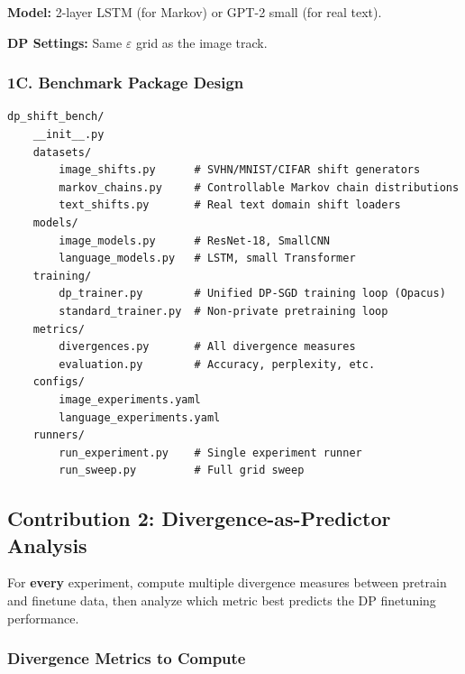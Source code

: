 \documentclass[11pt,a4paper]{article}
\begin{document}
\textbf{Model:} 2-layer LSTM (for Markov) or GPT-2 small (for real text).

\textbf{DP Settings:} Same $\varepsilon$ grid as the image track.

\subsubsection{1C. Benchmark Package Design}

\begin{lstlisting}
dp_shift_bench/
    __init__.py
    datasets/
        image_shifts.py      # SVHN/MNIST/CIFAR shift generators
        markov_chains.py     # Controllable Markov chain distributions
        text_shifts.py       # Real text domain shift loaders
    models/
        image_models.py      # ResNet-18, SmallCNN
        language_models.py   # LSTM, small Transformer
    training/
        dp_trainer.py        # Unified DP-SGD training loop (Opacus)
        standard_trainer.py  # Non-private pretraining loop
    metrics/
        divergences.py       # All divergence measures
        evaluation.py        # Accuracy, perplexity, etc.
    configs/
        image_experiments.yaml
        language_experiments.yaml
    runners/
        run_experiment.py    # Single experiment runner
        run_sweep.py         # Full grid sweep
\end{lstlisting}

\subsection{Contribution 2: Divergence-as-Predictor Analysis}

For \textbf{every} experiment, compute multiple divergence measures between pretrain and finetune data, then analyze which metric best predicts the DP finetuning performance.

\subsubsection{Divergence Metrics to Compute}
\end{document}
